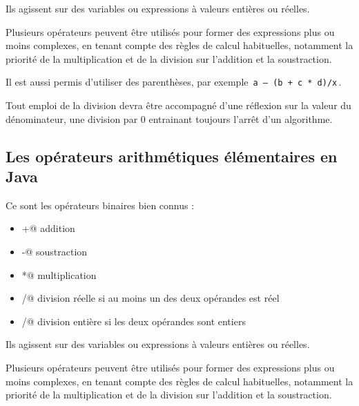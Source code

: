 \documentclass[11pt,a4paper]{article}
\begin{document}
          Ils agissent sur des variables ou expressions \`a valeurs enti\`eres ou r\'eelles. 
        
            \par
        
          Plusieurs op\'erateurs peuvent \^etre utilis\'es pour former des expressions plus ou moins complexes, 
          en tenant compte des r\`egles de calcul habituelles, notamment la priorit\'e de la multiplication et de la division
          sur l'addition et la soustraction. 
        
            \par
        
          Il est aussi permis d'utiliser des parenth\`eses, par exemple \,\verb|a – (b + c * d)/x|\,. 
        
            \par
        
          Tout emploi de la division devra \^etre accompagn\'e d'une r\'eflexion sur la
          valeur du d\'enominateur, une division par 0 entrainant toujours l'arr\^et d'un algorithme.
        
            \par
        \subsection{Les op\'erateurs arithm\'etiques \'el\'ementaires en Java}
          Ce sont les op\'erateurs binaires bien connus :
          
					\begin{itemize}
				
			\item \verb@+@ addition
			\item \verb@-@ soustraction
			\item \verb@*@ multiplication
			\item \verb@/@ division r\'eelle si au moins un des deux op\'erandes est r\'eel
			\item \verb@/@ division enti\`ere si les deux op\'erandes sont entiers
					\end{itemize}
				
          Ils agissent sur des variables ou expressions \`a valeurs enti\`eres ou r\'eelles. 
        
            \par
        
          Plusieurs op\'erateurs peuvent \^etre utilis\'es pour former des expressions plus ou moins complexes, 
          en tenant compte des r\`egles de calcul habituelles, notamment la priorit\'e de la multiplication et de la division
          sur l'addition et la soustraction. 
        
\end{document}
